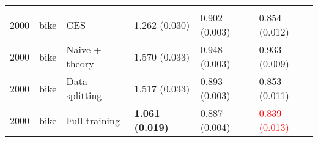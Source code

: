 \begin{tabular}[t]{rlllll}
\addlinespace[0.3em]
\multicolumn{6}{l}{\textbf{2000}}\\
\hspace{1em}2000 & bike & CES & 1.262 (0.030) & 0.902 (0.003) & 0.854 (0.012)\\
\hspace{1em}2000 & bike & Naive + theory & 1.570 (0.033) & 0.948 (0.003) & 0.933 (0.009)\\
\hspace{1em}2000 & bike & Data splitting & 1.517 (0.033) & 0.893 (0.003) & 0.853 (0.011)\\
\hspace{1em}2000 & bike & Full training & \textbf{1.061 (0.019)} & 0.887 (0.004) & \textcolor{red}{0.839 (0.013)}\\
\bottomrule
\end{tabular}


